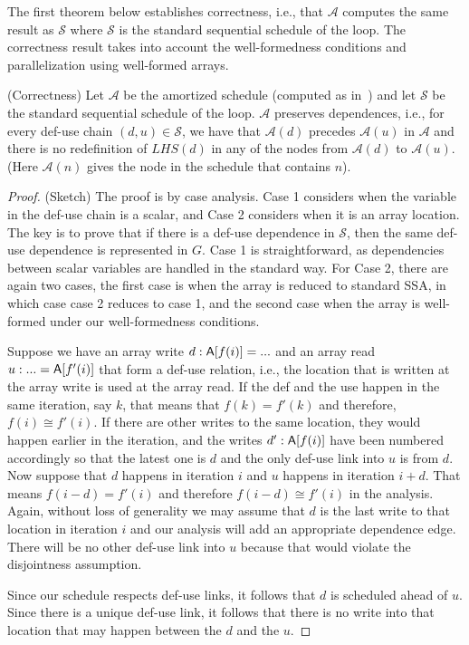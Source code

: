 The first theorem below establishes correctness, i.e., that $\mathcal{A}$ computes the same result as $\mathcal{S}$ where
$\mathcal{S}$ is the standard sequential schedule of the loop. The correctness result takes into account
the well-formedness conditions and parallelization using well-formed arrays.

\begin{theorem}(Correctness)
Let $\mathcal{A}$ be the amortized schedule (computed as in~) and let $\mathcal{S}$ be the standard sequential 
schedule of the loop. $\mathcal{A}$ preserves dependences, i.e., for every def-use chain $(d,u) \in \mathcal{S}$, we have that
$\mathcal{A}(d)$ precedes $\mathcal{A}(u)$ in $\mathcal{A}$ and there is no redefinition of $\mathit{LHS}(d)$ in any 
of the nodes from $\mathcal{A}(d)$ to $\mathcal{A}(u)$. (Here $\mathcal{A}(n)$ gives the node in the schedule that contains $n$).
\end{theorem}

\begin{proof} (Sketch)
The proof is by case analysis. Case 1 considers when the variable in the def-use 
chain is a scalar, and Case 2 considers when it is an array location. 
The key is to prove that if there is a def-use dependence in $\mathcal{S}$, then the same def-use dependence
is represented in $G$.
Case 1 is straightforward, as dependencies between scalar variables are handled in the standard way. 
For Case 2, there are again two cases, the first case is when the array is reduced to standard SSA, in which 
case case 2 reduces to case 1, and the second case when the array is well-formed under our well-formedness
conditions. 

Suppose we have an array write $d: {\sf A}[f(i)] = ...$ and an array read $u: ... = {\sf A}[f'(i)]$ that form a def-use relation, i.e., 
the location that is written at the array write is used at the array read. If the def and the use happen in the same 
iteration, say $k$, that means that $f(k) = f'(k)$ and therefore, $f(i) \cong f'(i)$. If there are other writes to the same
location, they would happen earlier in the iteration, and the writes $d': {\sf A}[f(i)]$ have been numbered accordingly so
that the latest one is $d$ and the only def-use link into $u$ is from $d$. Now suppose that $d$ happens in iteration $i$
and $u$ happens in iteration $i+d$. That means $f(i-d) = f'(i)$ and therefore $f(i-d) \cong f'(i)$ in the analysis. Again, 
without loss of generality we may assume that $d$ is the last write to that location in iteration $i$ and our analysis 
will add an appropriate dependence edge. There will be no other def-use link into $u$ because that would
violate the disjointness assumption. 

Since our schedule respects def-use links, it follows that $d$ is scheduled ahead of $u$. Since there is a unique def-use
link, it follows that there is no write into that location that may happen between the $d$ and the $u$. 
\end{proof}

